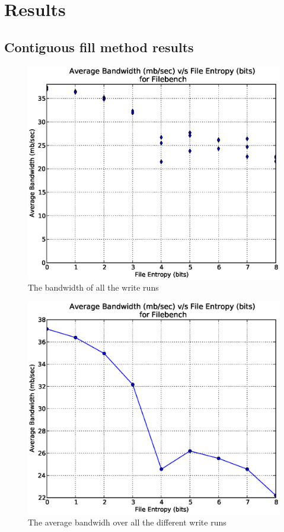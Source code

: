 \chapter{Results}\label{chap:res}

\section{Contiguous fill method results}

\begin{figure}
\label{fig:wb}
\begin{center}
\includegraphics[scale=.55]{../results/write_bw_all.eps}
\caption{The bandwidth of all the write runs}
\end{center}
\end{figure}

\begin{figure}
\label{fig:wbavg}
\begin{center}
\includegraphics[scale=.55]{../results/write_bw_avg.eps}
\caption{The average bandwidh over all the different write runs}
\end{center}
\end{figure}

